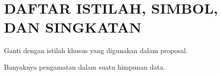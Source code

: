 \chapter*{DAFTAR ISTILAH, SIMBOL, DAN SINGKATAN}
\begin{description}[style=nextline,leftmargin=3.5cm,labelwidth=3cm]
  \item[Istilah contoh] Ganti dengan istilah khusus yang digunakan dalam proposal.
  \item[$n$] Banyaknya pengamatan dalam suatu himpunan data.
\end{description}
\clearpage
